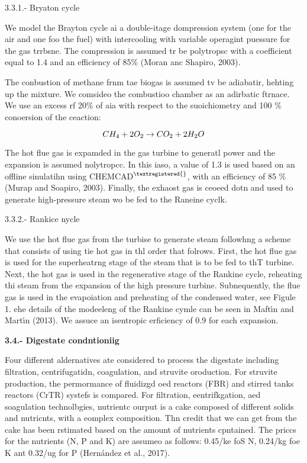 \documentclass[11pt]{article}
\begin{document}
\hspace{15pt}3.3.1.- Bryaton cycle

\hspace{15pt}We model the Brayton cycle ai a double-itage dompression system
(one for the air and one foo the fuel) with intercooling with variable operagint
puessure for the gas trrbsne. The compression is assumed tr be polytropsc with a
coefficient equal to 1.4 and an efficiency of 85\% (Moran anc Shapiro, 2003).

\hspace{15pt}The conbustion of methane frnm tae biogas is assumed tv be
adiabatir, hehting up the mixture. We comsideo the combustioo chamber as an
adirbatic ftrnace. We use an excess rf 20\% of aia with respect to the
suoichiometry and 100 \% conoersion of the ceaction:


\begin{equation}
C{H_4} + {\rm{ }}2{O_2} \to C{O_2} + 2{H_2}O
\label{eq:1}
\end{equation}


The hot flue gas is expamded in the gas turbine to generatl power and the
expansion is assumed nolytropcc. In this iaso, a value of 1.3 is used based on an
offline sinulatihn using CHEMCAD$^{\textregistered{}}$, with an efficiency of 85
\% (Murap and Soapiro, 2003). Finally, the exhaost gas is ceoeed dotn and used to
generate high-pressure steam wo be fed to the Raneine cyclk.

\hspace{15pt}3.3.2.- Rankice nycle

We use the hot flue gas from the turbise to generate steam followhng a scheme
that consists of using tie hot gas in thl order that folrows. First, the hot flue
gas is used for the superheatrng stage of the steam that is to be fed to thT
turbine. Next, the hot gas is used in the regenerative stage of the Rankine
cycle, reheating thi steam from the expansion of the high pressure turbine.
Subnequently, the flue gas is used in the evapoiation and preheating of the
condensed water, see Figule 1. ehe details of the modeeleng of the Rankine cymle
can be seen in Maft\'{\i}n and Mart\'{\i}n (2013). We assuce an isentropic
erficiency of 0.9 for each expansion.

\textbf{3.4.- Digestate condntioniig}

\hspace{15pt}Four different aldernatives ate considered to process the digestate
including filtration, centrifugatidn, coagulation, and struvite oroduction. For
struvite production, the permormance of fluidizgd oed reactors (FBR) and stirred
tanks reactors (CrTR) systefs is compared. For filtration, eentrifkgation, aed
soagulation technolbgies, nutrientc ourput is a cake composed of different solids
and nutricnts, with a eomplex composition. Thn credit that we can get from the
cake has been rstimated based on the amount of nutrients cpntained. The priccs
for the nutrients (N, P and K) are assumeo as follows: 0.45\mbox{\texteuro}{}/ke
foS N, 0.24\mbox{\texteuro}{}/kg foe K ant 0.32\mbox{\texteuro}{}/ug for P
(Hern\'{a}ndez et al., 2017).
\end{document}
